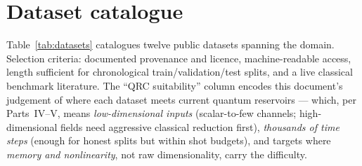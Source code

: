 \section{Dataset catalogue}
\label{sec:catalogue}

Table~\ref{tab:datasets} catalogues twelve public datasets spanning the
domain. Selection criteria: documented provenance and licence, machine-readable
access, length sufficient for chronological train/validation/test splits, and
a live classical benchmark literature. The ``QRC suitability'' column encodes
this document's judgement of where each dataset meets current quantum
reservoirs --- which, per Parts~IV--V, means \emph{low-dimensional inputs}
(scalar-to-few channels; high-dimensional fields need aggressive classical
reduction first), \emph{thousands of time steps} (enough for honest splits
but within shot budgets), and targets where \emph{memory and nonlinearity},
not raw dimensionality, carry the difficulty.

